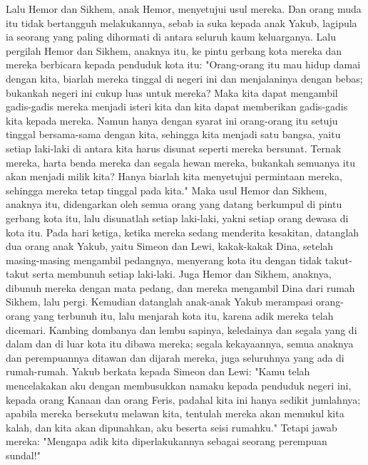 \begin{biblechapter}
\verse Lalu Hemor dan Sikhem, anak Hemor, menyetujui usul mereka.
\verse Dan orang muda itu tidak bertangguh melakukannya, sebab ia suka kepada anak Yakub, lagipula ia seorang yang paling dihormati di antara seluruh kaum keluarganya.
\verse Lalu pergilah Hemor dan Sikhem, anaknya itu, ke pintu gerbang kota mereka dan mereka berbicara kepada penduduk kota itu:
\verse "Orang-orang itu mau hidup damai dengan kita, biarlah mereka tinggal di negeri ini dan menjalaninya dengan bebas; bukankah negeri ini cukup luas untuk mereka? Maka kita dapat mengambil gadis-gadis mereka menjadi isteri kita dan kita dapat memberikan gadis-gadis kita kepada mereka.
\verse Namun hanya dengan syarat ini orang-orang itu setuju tinggal bersama-sama dengan kita, sehingga kita menjadi satu bangsa, yaitu setiap laki-laki di antara kita harus disunat seperti mereka bersunat.
\verse Ternak mereka, harta benda mereka dan segala hewan mereka, bukankah semuanya itu akan menjadi milik kita? Hanya biarlah kita menyetujui permintaan mereka, sehingga mereka tetap tinggal pada kita."
\verse Maka usul Hemor dan Sikhem, anaknya itu, didengarkan oleh semua orang yang datang berkumpul di pintu gerbang kota itu, lalu disunatlah setiap laki-laki, yakni setiap orang dewasa di kota itu.
\verse Pada hari ketiga, ketika mereka sedang menderita kesakitan, datanglah dua orang anak Yakub, yaitu Simeon dan Lewi, kakak-kakak Dina, setelah masing-masing mengambil pedangnya, menyerang kota itu dengan tidak takut-takut serta membunuh setiap laki-laki.
\verse Juga Hemor dan Sikhem, anaknya, dibunuh mereka dengan mata pedang, dan mereka mengambil Dina dari rumah Sikhem, lalu pergi.
\verse Kemudian datanglah anak-anak Yakub merampasi orang-orang yang terbunuh itu, lalu menjarah kota itu, karena adik mereka telah dicemari.
\verse Kambing dombanya dan lembu sapinya, keledainya dan segala yang di dalam dan di luar kota itu dibawa mereka;
\verse segala kekayaannya, semua anaknya dan perempuannya ditawan dan dijarah mereka, juga seluruhnya yang ada di rumah-rumah.
\verse Yakub berkata kepada Simeon dan Lewi: "Kamu telah mencelakakan aku dengan membusukkan namaku kepada penduduk negeri ini, kepada orang Kanaan dan orang Feris, padahal kita ini hanya sedikit jumlahnya; apabila mereka bersekutu melawan kita, tentulah mereka akan memukul kita kalah, dan kita akan dipunahkan, aku beserta seisi rumahku."
\verse Tetapi jawab mereka: "Mengapa adik kita diperlakukannya sebagai seorang perempuan sundal!"
\end{biblechapter}


